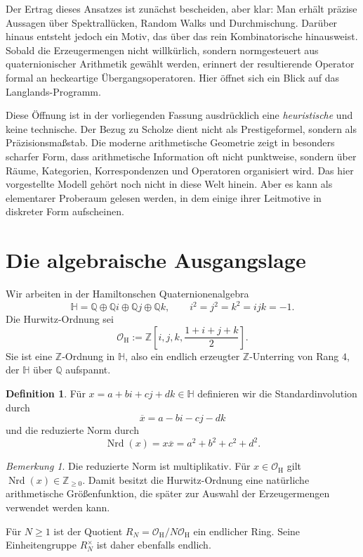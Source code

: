 \documentclass[12pt,a4paper]{article}
\theoremstyle{plain}
\theoremstyle{definition}
\newtheorem{definition}[satz]{Definition}
\theoremstyle{remark}
\newtheorem{bemerkung}[satz]{Bemerkung}
\newcommand{\Z}{\mathbb{Z}}
\newcommand{\Q}{\mathbb{Q}}
\newcommand{\HH}{\mathbb{H}}
\newcommand{\OH}{\mathcal{O}_{\mathrm H}}
\newcommand{\RN}{R_N}
\begin{document}
Der Ertrag dieses Ansatzes ist zunächst bescheiden, aber klar: Man erhält präzise Aussagen über Spektrallücken, Random Walks und Durchmischung. Darüber hinaus entsteht jedoch ein Motiv, das über das rein Kombinatorische hinausweist. Sobald die Erzeugermengen nicht willkürlich, sondern normgesteuert aus quaternionischer Arithmetik gewählt werden, erinnert der resultierende Operator formal an heckeartige Übergangsoperatoren. Hier öffnet sich ein Blick auf das Langlands-Programm.

Diese Öffnung ist in der vorliegenden Fassung ausdrücklich eine \emph{heuristische} und keine technische. Der Bezug zu Scholze dient nicht als Prestigeformel, sondern als Präzisionsmaßstab. Die moderne arithmetische Geometrie zeigt in besonders scharfer Form, dass arithmetische Information oft nicht punktweise, sondern über Räume, Kategorien, Korrespondenzen und Operatoren organisiert wird. Das hier vorgestellte Modell gehört noch nicht in diese Welt hinein. Aber es kann als elementarer Proberaum gelesen werden, in dem einige ihrer Leitmotive in diskreter Form aufscheinen.

\section{Die algebraische Ausgangslage}
Wir arbeiten in der Hamiltonschen Quaternionenalgebra
\[
\HH = \Q \oplus \Q i \oplus \Q j \oplus \Q k,
\qquad i^2=j^2=k^2=ijk=-1.
\]
Die Hurwitz-Ordnung sei
\[
\OH := \Z\left[i,j,k,\frac{1+i+j+k}{2}\right].
\]
Sie ist eine \(\Z\)-Ordnung in \(\HH\), also ein endlich erzeugter \(\Z\)-Unterring von Rang \(4\), der \(\HH\) über \(\Q\) aufspannt.

\begin{definition}
Für \(x=a+bi+cj+dk\in \HH\) definieren wir die Standardinvolution durch
\[
\overline{x}=a-bi-cj-dk
\]
und die reduzierte Norm durch
\[
\operatorname{Nrd}(x)=x\overline{x}=a^2+b^2+c^2+d^2.
\]
\end{definition}

\begin{bemerkung}
Die reduzierte Norm ist multiplikativ. Für \(x\in \OH\) gilt \(\operatorname{Nrd}(x)\in \Z_{\ge 0}\). Damit besitzt die Hurwitz-Ordnung eine natürliche arithmetische Größenfunktion, die später zur Auswahl der Erzeugermengen verwendet werden kann.
\end{bemerkung}

Für \(N\ge 1\) ist der Quotient \(\RN=\OH/N\OH\) ein endlicher Ring. Seine Einheitengruppe \(\RN^\times\) ist daher ebenfalls endlich.
\end{document}

